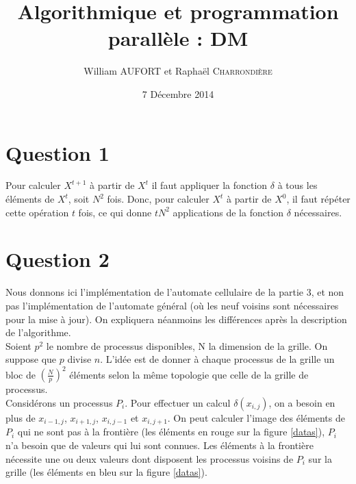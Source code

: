 \documentclass{article}
\title{Algorithmique et programmation parallèle : DM}
\author{William \textsc{AUFORT} et Raphaël \textsc{Charrondière}}
\date{7 Décembre 2014}
\newcommand{\X}[1]{{X}^{ #1 }}
\begin{document}
\maketitle

\section*{Question 1}

Pour calculer $\X{t+1}$ à partir de $\X{t}$ il faut appliquer la fonction $\delta$ à tous les éléments de $\X{t}$, soit $N^2$ fois.
Donc, pour calculer $\X{t}$ à partir de $\X{0}$, il faut répéter cette opération $t$ fois, ce qui donne $t N^2$ applications de la fonction $\delta$ nécessaires.

\section*{Question 2}

Nous donnons ici l'implémentation de l'automate cellulaire de la partie 3, et non pas l'implémentation de l'automate général (où les neuf voisins sont nécessaires pour la mise à jour). On expliquera néanmoins les différences après la description de l'algorithme. \\

Soient $p^2$ le nombre de processus disponibles, N la dimension de la grille. On suppose que $p$ divise $n$.
L'idée est de donner à chaque processus de la grille un bloc de $\left( \frac{N}{p} \right) ^2$ éléments selon la même topologie que celle de la grille de processus. \\

Considérons un processus $P_i$. 
Pour effectuer un calcul $\delta(x_{i,j})$, on a besoin en plus de $x_{i-1,j}$, $x_{i+1,j}$, $x_{i,j-1}$ et $x_{i,j+1}$.
On peut calculer l'image des éléments de $P_i$ qui ne sont pas à la frontière (les éléments en rouge sur la figure \ref{datas}), $P_i$ n'a besoin que de valeurs qui lui sont connues.
Les éléments à la frontière nécessite une ou deux valeurs dont disposent les processus voisins de $P_i$ sur la grille (les éléments en bleu sur la figure \ref{datas}).
\end{document}
